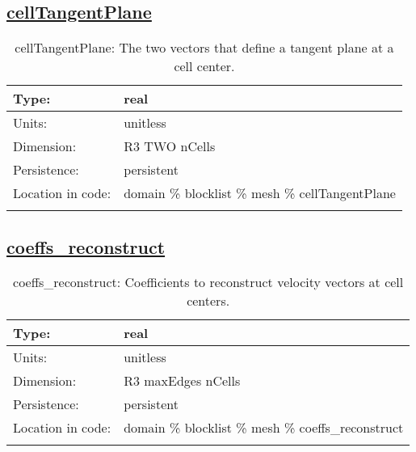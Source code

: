 \subsection[cellTangentPlane]{\hyperref[sec:var_tab_mesh]{cellTangentPlane}}
\label{subsec:var_sec_mesh_cellTangentPlane}
\begin{center}
\begin{longtable}{| p{2.0in} | p{4.0in} |}
        \hline 
        Type: & real \\
        \hline 
        Units: & \si{unitless} \\
        \hline 
        Dimension: & R3 TWO nCells \\
        \hline 
        Persistence: & persistent \\
        \hline 
         Location in code: & domain \% blocklist \% mesh \% cellTangentPlane \\
         \hline 
    \caption{cellTangentPlane: The two vectors that define a tangent plane at a cell center.}
\end{longtable}
\end{center}
\subsection[coeffs\_reconstruct]{\hyperref[sec:var_tab_mesh]{coeffs\_reconstruct}}
\label{subsec:var_sec_mesh_coeffs_reconstruct}
\begin{center}
\begin{longtable}{| p{2.0in} | p{4.0in} |}
        \hline 
        Type: & real \\
        \hline 
        Units: & \si{unitless} \\
        \hline 
        Dimension: & R3 maxEdges nCells \\
        \hline 
        Persistence: & persistent \\
        \hline 
         Location in code: & domain \% blocklist \% mesh \% coeffs\_reconstruct \\
         \hline 
    \caption{coeffs\_reconstruct: Coefficients to reconstruct velocity vectors at cell centers.}
\end{longtable}
\end{center}
